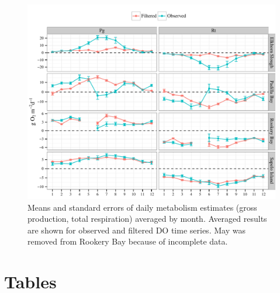 \documentclass[letterpaper,12pt,oneside]{article}\usepackage[]{graphicx}\usepackage[]{color}
\makeatletter
\def\maxwidth{ %
  \ifdim\Gin@nat@width>\linewidth
    \linewidth
  \else
    \Gin@nat@width
  \fi
}
\newenvironment{knitrout}{}{} %
\makeatother
\begin{document}
\centering\vspace*{\fill}
\begin{knitrout}
\color{fgcolor}\begin{figure}[!ht]


{\centering \includegraphics[width=\maxwidth]{figure/metab_sum} 

}

\caption[Means and standard errors of daily metabolism estimates (gross production, total respiration) averaged by month]{Means and standard errors of daily metabolism estimates (gross production, total respiration) averaged by month.  Averaged results are shown for observed and filtered \ac{DO} time series.  May was removed from Rookery Bay because of incomplete data.\label{fig:metab_sum}}
\end{figure}


\end{knitrout}
\vfill
\clearpage


\section{Tables}
\end{document}
